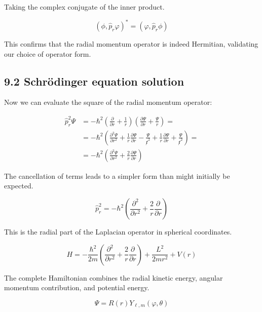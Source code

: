 \documentclass[italian]{HKNdocument}
\begin{document}
Taking the complex conjugate of the inner product.

\begin{equation*}
\left(\phi, \hat{p}_{r} \varphi\right)^{*}=\left(\varphi, \hat{p}_{r} \phi\right) \tag{9.26}
\end{equation*}

This confirms that the radial momentum operator is indeed Hermitian, validating our choice of operator form.

\subsection*{9.2 Schrödinger equation solution}
Now we can evaluate the square of the radial momentum operator:

\begin{align*}
\hat{p}_{r}^{2} \Psi & =-\hbar^{2}\left(\frac{\partial}{\partial r}+\frac{1}{r}\right)\left(\frac{\partial \Psi}{\partial r}+\frac{\Psi}{r}\right)= \\
& =-\hbar^{2}\left(\frac{\partial^{2} \Psi}{\partial r^{2}}+\frac{1}{r} \frac{\partial \Psi}{\partial r}-\frac{\Psi}{\not r^{2}}+\frac{1}{r} \frac{\partial \Psi}{\partial r}+\frac{\Psi}{\not r^{2}}\right)=  \tag{9.27}\\
& =-\hbar^{2}\left(\frac{\partial^{2} \Psi}{\partial r^{2}}+\frac{2}{r} \frac{\partial \Psi}{\partial r}\right)
\end{align*}

The cancellation of terms leads to a simpler form than might initially be expected.

\begin{equation*}
\hat{p}_{r}^{2}=-\hbar^{2}\left(\frac{\partial^{2}}{\partial r^{2}}+\frac{2}{r} \frac{\partial}{\partial r}\right) \tag{9.28}
\end{equation*}

This is the radial part of the Laplacian operator in spherical coordinates.

\begin{equation*}
H=-\frac{\hbar^{2}}{2 m}\left(\frac{\partial^{2}}{\partial r^{2}}+\frac{2}{r} \frac{\partial}{\partial r}\right)+\frac{L^{2}}{2 m r^{2}}+V(r) \tag{9.29}
\end{equation*}

The complete Hamiltonian combines the radial kinetic energy, angular momentum contribution, and potential energy.

\begin{equation*}
\Psi=R(r) Y_{\ell, m}(\varphi, \theta) \tag{9.30}
\end{equation*}
\end{document}
